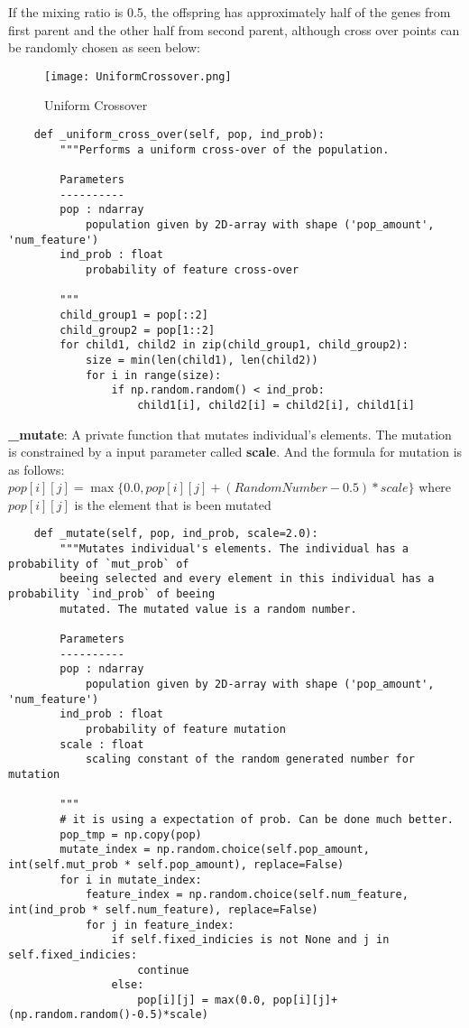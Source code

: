 \documentclass[12pt]{article}
\begin{document}
If the mixing ratio is 0.5, the offspring has approximately half of the genes from first parent and the other half from second parent, although cross over points can be randomly chosen as seen below:
\begin{figure}[H]
    \centering
    \texttt{[image: UniformCrossover.png]}
    \caption{Uniform Crossover}
    \label{fig:uniformcrossover}
\end{figure}
\begin{verbatim}
	def _uniform_cross_over(self, pop, ind_prob):
		"""Performs a uniform cross-over of the population.
	
	    Parameters
	    ----------
	    pop : ndarray
	    	population given by 2D-array with shape ('pop_amount', 'num_feature')
	    ind_prob : float
	    	probability of feature cross-over
	
		"""
		child_group1 = pop[::2]
		child_group2 = pop[1::2]
		for child1, child2 in zip(child_group1, child_group2):
			size = min(len(child1), len(child2))
			for i in range(size):
				if np.random.random() < ind_prob:
					child1[i], child2[i] = child2[i], child1[i]
\end{verbatim}
\textbf{\_mutate}: A private function that mutates individual's elements. The mutation is constrained by a input parameter called \textbf{scale}. And the formula for mutation is as follows:
$pop[i][j] = \max\{0.0, pop[i][j]+(RandomNumber-0.5)*scale\}$ where $pop[i][j]$ is the element that is been mutated
\begin{verbatim}
	def _mutate(self, pop, ind_prob, scale=2.0):
		"""Mutates individual's elements. The individual has a probability of `mut_prob` of
		beeing selected and every element in this individual has a probability `ind_prob` of beeing
		mutated. The mutated value is a random number.

		Parameters
		----------
		pop : ndarray
			population given by 2D-array with shape ('pop_amount', 'num_feature')
	    ind_prob : float
	    	probability of feature mutation
	    scale : float
	    	scaling constant of the random generated number for mutation

		"""
		# it is using a expectation of prob. Can be done much better.
		pop_tmp = np.copy(pop)
		mutate_index = np.random.choice(self.pop_amount, int(self.mut_prob * self.pop_amount), replace=False)
		for i in mutate_index:
			feature_index = np.random.choice(self.num_feature, int(ind_prob * self.num_feature), replace=False)
			for j in feature_index:
				if self.fixed_indicies is not None and j in self.fixed_indicies:
					continue
				else:
					pop[i][j] = max(0.0, pop[i][j]+(np.random.random()-0.5)*scale)
\end{verbatim}
\end{document}

